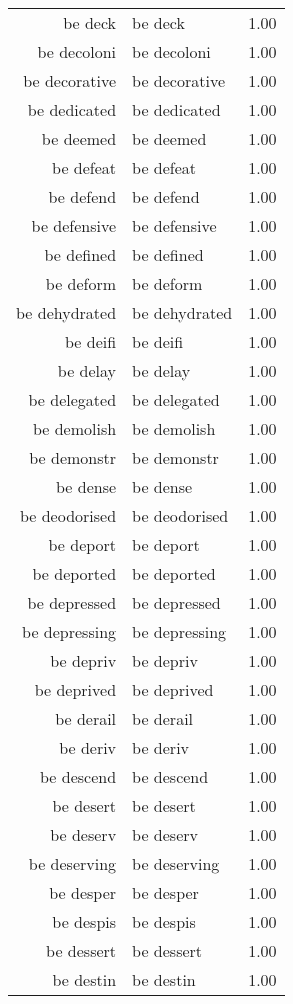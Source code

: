 \begin{table}[ht]
\begin{tabular}{rlr}
  be deck & be deck & 1.00 \\ 
  be decoloni & be decoloni & 1.00 \\ 
  be decorative & be decorative & 1.00 \\ 
  be dedicated & be dedicated & 1.00 \\ 
  be deemed & be deemed & 1.00 \\ 
  be defeat & be defeat & 1.00 \\ 
  be defend & be defend & 1.00 \\ 
  be defensive & be defensive & 1.00 \\ 
  be defined & be defined & 1.00 \\ 
  be deform & be deform & 1.00 \\ 
  be dehydrated & be dehydrated & 1.00 \\ 
  be deifi & be deifi & 1.00 \\ 
  be delay & be delay & 1.00 \\ 
  be delegated & be delegated & 1.00 \\ 
  be demolish & be demolish & 1.00 \\ 
  be demonstr & be demonstr & 1.00 \\ 
  be dense & be dense & 1.00 \\ 
  be deodorised & be deodorised & 1.00 \\ 
  be deport & be deport & 1.00 \\ 
  be deported & be deported & 1.00 \\ 
  be depressed & be depressed & 1.00 \\ 
  be depressing & be depressing & 1.00 \\ 
  be depriv & be depriv & 1.00 \\ 
  be deprived & be deprived & 1.00 \\ 
  be derail & be derail & 1.00 \\ 
  be deriv & be deriv & 1.00 \\ 
  be descend & be descend & 1.00 \\ 
  be desert & be desert & 1.00 \\ 
  be deserv & be deserv & 1.00 \\ 
  be deserving & be deserving & 1.00 \\ 
  be desper & be desper & 1.00 \\ 
  be despis & be despis & 1.00 \\ 
  be dessert & be dessert & 1.00 \\ 
  be destin & be destin & 1.00 \\ 

\end{tabular}
\end{table}
